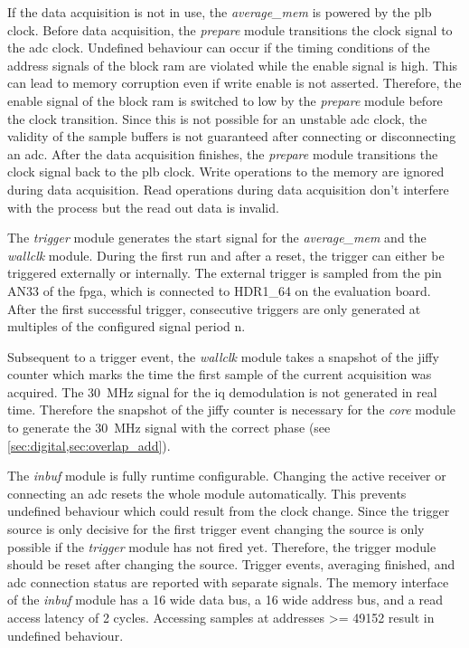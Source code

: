 \documentclass[12pt,a4paper,parskip=full,abstract=true,BCOR=12mm,twoside,open=right]{scrreprt}
\def\device#1{\mbox{\textit{#1}}}
\begin{document}
If the data acquisition is not in use, the \device{average\_mem} is powered by
the \gls{plb} clock. Before data acquisition, the \device{prepare} module
transitions the clock signal to the \gls{adc} clock. Undefined behaviour can
occur if the timing conditions of the address signals of the block \gls{ram}
are violated while the enable signal is high. This can lead to memory corruption
even if write enable is not asserted\cite{virtex5}. Therefore, the enable signal
of the block \gls{ram} is switched to low by the \device{prepare} module before
the clock transition. Since this is not possible for an unstable \gls{adc} clock,
the validity of the sample buffers is not guaranteed after connecting or
disconnecting an \gls{adc}. After the data acquisition finishes, the
\device{prepare} module transitions the clock signal back to the \gls{plb} clock.
Write operations to the memory are ignored during data acquisition. Read operations
during data acquisition don't interfere with the process but the read out data is invalid.

The \device{trigger} module generates the start signal for the \device{average\_mem}
and the \device{wallclk} module. During the first run and after a reset, the trigger can either be triggered
externally or internally. The external trigger is sampled from the pin AN33 of the
\gls{fpga}, which is connected to HDR1\_64 on the evaluation board. After the first
successful trigger, consecutive triggers are only generated at multiples of the configured signal period \gls{n}.

Subsequent to a trigger event, the \device{wallclk} module takes a snapshot of the
jiffy counter which marks the time the first sample of the current acquisition
was acquired. The \SI{30}{\mega\hertz} signal for the \gls{iq} demodulation
is not generated in real time. Therefore the snapshot of the jiffy counter is necessary
for the \device{core} module to generate the \SI{30}{\mega\hertz} signal with the
correct phase (see \cref{sec:digital,sec:overlap_add}).

The \device{inbuf} module is fully runtime configurable. Changing the active receiver
or connecting an \gls{adc} resets the whole module automatically. This prevents undefined
behaviour which could result from the clock change. Since the trigger source is only
decisive for the first trigger event changing the source is only possible if the \device{trigger}
module has not fired yet. Therefore, the trigger module should be reset after changing
the source. Trigger events, averaging finished, and \gls{adc} connection status are reported
with separate signals. The memory interface of the \device{inbuf} module has a \SI{16}{\bit} wide data bus,
a \SI{16}{\bit} wide address bus, and a read access latency of 2 cycles. Accessing samples
at addresses \num{>= 49152} result in undefined behaviour.
\end{document}
